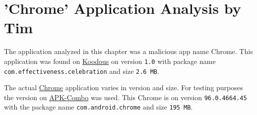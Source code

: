 \section{'Chrome' Application Analysis by Tim}

The application analyzed in this chapter was a malicious app name Chrome.
This application was found on \href{https://koodous.com/apks/ef613e042afafb955baedc75033f6ff73d19a795ae7f541981dfe624bc700887}{Koodous} 
on version \texttt{1.0} with package name \texttt{com.effectiveness.celebration} and size \texttt{2.6 MB}.

The actual \href{https://play.google.com/store/apps/details?id=com.android.chrome&hl=en&gl=US}{Chrome} application varies in version and size. 
For testing purposes the version on \href{https://apkcombo.com/nl/chrome/com.android.chrome/}{APK-Combo} was used.
This Chrome is on version \texttt{96.0.4664.45} with the package name \texttt{com.android.chrome} and size \texttt{195 MB}.

















